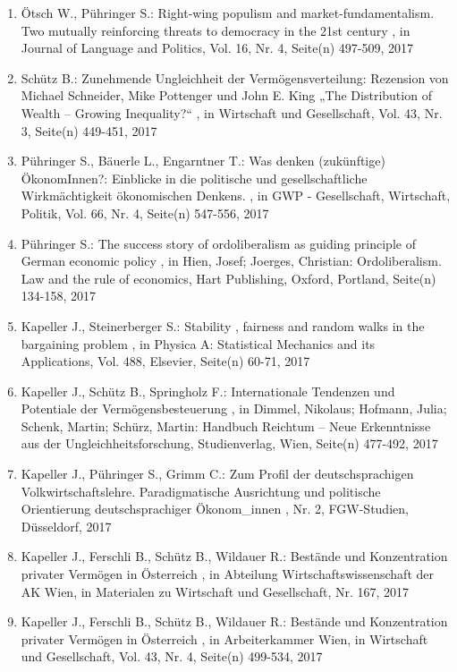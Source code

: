  \begin{enumerate}[leftmargin=*, labelsep=0.5cm] 
	 \item Ötsch W., Pühringer S.:  Right-wing populism and market-fundamentalism. Two mutually reinforcing threats to democracy in the 21st century  , in Journal of Language and Politics, Vol. 16, Nr. 4, Seite(n) 497-509, 2017
	 \item Schütz B.:  Zunehmende Ungleichheit der Vermögensverteilung: Rezension von Michael Schneider, Mike Pottenger und John E. King „The Distribution of Wealth – Growing Inequality?“  , in Wirtschaft und Gesellschaft, Vol. 43, Nr. 3, Seite(n) 449-451, 2017
	 \item Pühringer S., Bäuerle L., Engarntner T.:  Was denken (zukünftige) ÖkonomInnen?: Einblicke in die politische und gesellschaftliche Wirkmächtigkeit ökonomischen Denkens.  , in GWP - Gesellschaft, Wirtschaft, Politik, Vol. 66, Nr. 4, Seite(n) 547-556, 2017
	 \item Pühringer S.:  The success story of ordoliberalism as guiding principle of German economic policy  , in Hien, Josef; Joerges, Christian: Ordoliberalism. Law and the rule of economics, Hart Publishing, Oxford, Portland, Seite(n) 134-158, 2017
	 \item Kapeller J., Steinerberger S.:  Stability , fairness and random walks in the bargaining problem  , in Physica A: Statistical Mechanics and its Applications, Vol. 488, Elsevier, Seite(n) 60-71, 2017
	 \item Kapeller J., Schütz B., Springholz F.:  Internationale Tendenzen und Potentiale der Vermögensbesteuerung  , in Dimmel, Nikolaus; Hofmann, Julia; Schenk, Martin; Schürz, Martin: Handbuch Reichtum – Neue Erkenntnisse aus der Ungleichheitsforschung, Studienverlag, Wien, Seite(n) 477-492, 2017
	 \item Kapeller J., Pühringer S., Grimm C.:  Zum Profil der deutschsprachigen Volkwirtschaftslehre. Paradigmatische Ausrichtung und politische Orientierung deutschsprachiger Ökonom_innen  , Nr. 2, FGW-Studien, Düsseldorf, 2017
	 \item Kapeller J., Ferschli B., Schütz B., Wildauer R.:  Bestände und Konzentration privater Vermögen in Österreich  , in Abteilung Wirtschaftswissenschaft der AK Wien, in Materialen zu Wirtschaft und Gesellschaft, Nr. 167, 2017
	 \item Kapeller J., Ferschli B., Schütz B., Wildauer R.:  Bestände und Konzentration privater Vermögen in Österreich  , in Arbeiterkammer Wien, in Wirtschaft und Gesellschaft, Vol. 43, Nr. 4, Seite(n) 499-534, 2017

\end{enumerate}
